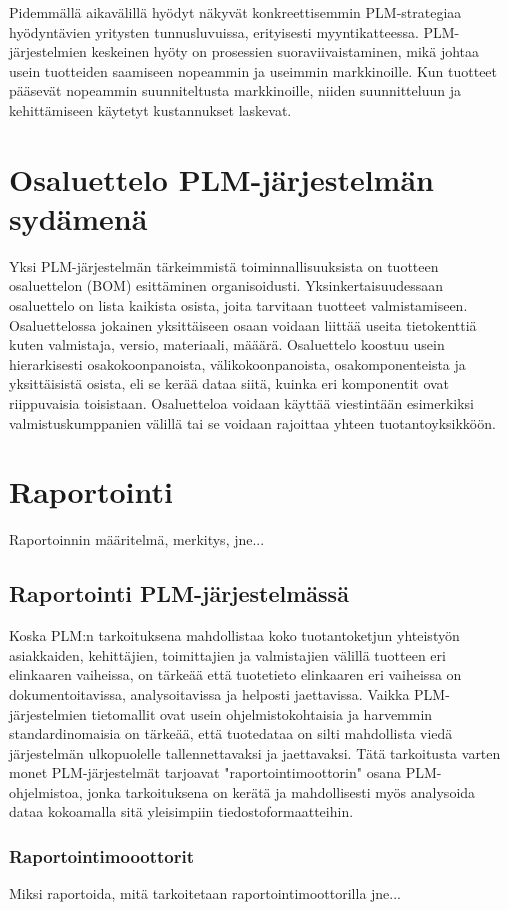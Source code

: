 Pidemmällä aikavälillä hyödyt näkyvät konkreettisemmin PLM-strategiaa hyödyntävien yritysten tunnusluvuissa, erityisesti myyntikatteessa. PLM-järjestelmien keskeinen hyöty on prosessien suoraviivaistaminen, mikä johtaa usein tuotteiden saamiseen nopeammin ja useimmin markkinoille. Kun tuotteet pääsevät nopeammin suunniteltusta markkinoille, niiden suunnitteluun ja kehittämiseen käytetyt kustannukset laskevat. \cite{bouhaddou_plm_2012} \cite{alemanni_key_2008}


\section{Osaluettelo PLM-järjestelmän sydämenä} \label{Osaluettelo PLM-järjestelmän sydämenä}

Yksi PLM-järjestelmän tärkeimmistä toiminnallisuuksista on tuotteen osaluettelon (BOM) esittäminen organisoidusti. \cite{david_what_2016} Yksinkertaisuudessaan osaluettelo on lista kaikista osista, joita tarvitaan tuotteet valmistamiseen. Osaluettelossa jokainen yksittäiseen osaan voidaan liittää useita tietokenttiä kuten valmistaja, versio, materiaali, määärä. Osaluettelo koostuu usein hierarkisesti osakokoonpanoista, välikokoonpanoista, osakomponenteista ja yksittäisistä osista, eli se kerää dataa siitä, kuinka eri komponentit ovat riippuvaisia toisistaan. Osaluetteloa voidaan käyttää viestintään esimerkiksi valmistuskumppanien välillä tai se voidaan rajoittaa yhteen tuotantoyksikköön.  \cite{jones_visualizing_2023}


\section{Raportointi} \label{Raportointi}

Raportoinnin määritelmä, merkitys, jne...

\subsection{Raportointi PLM-järjestelmässä} \label{Raportointi PLM-järjestelmässä}

Koska PLM:n tarkoituksena mahdollistaa koko tuotantoketjun yhteistyön asiakkaiden, kehittäjien, toimittajien ja valmistajien välillä tuotteen eri elinkaaren vaiheissa, \cite{bouhaddou_plm_2012} on tärkeää että tuotetieto elinkaaren eri vaiheissa on dokumentoitavissa, analysoitavissa ja helposti jaettavissa. Vaikka PLM-järjestelmien tietomallit ovat usein ohjelmistokohtaisia ja harvemmin standardinomaisia \cite{SritiMohamed-Foued2012PTaS} on tärkeää, että tuotedataa on silti mahdollista viedä järjestelmän ulkopuolelle tallennettavaksi ja jaettavaksi. Tätä tarkoitusta varten monet PLM-järjestelmät tarjoavat "raportointimoottorin" osana PLM-ohjelmistoa, jonka tarkoituksena on kerätä ja mahdollisesti myös analysoida dataa kokoamalla sitä yleisimpiin tiedostoformaatteihin.

\subsubsection{Raportointimooottorit} \label{Raportointimoottorit}

Miksi raportoida, mitä tarkoitetaan raportointimoottorilla jne...